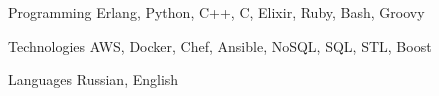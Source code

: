 

\begin{cvskills}

  \cvskill
    {Programming} %
    {Erlang, Python, C++, C, Elixir, Ruby, Bash, Groovy} %

  \cvskill
    {Technologies} %
    {AWS, Docker, Chef, Ansible, NoSQL, SQL, STL, Boost} %

  \cvskill
    {Languages} %
    {Russian, English} %

\end{cvskills}
